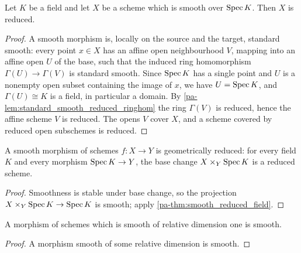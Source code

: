 \begin{theorem}
  \label{pa-thm:smooth_reduced_field}
  \leanok

  Let \(K\) be a field and let \(X\) be a scheme which is smooth over \(\operatorname{Spec} K\). Then \(X\)
  is reduced.
\end{theorem}
\begin{proof}
  \leanok
  A smooth morphism is, locally on the source and the target, standard smooth: every point
  \(x \in X\) has an affine open neighbourhood \(V\), mapping into an affine open \(U\) of the
  base, such that the induced ring homomorphism \(\Gamma(U) \to \Gamma(V)\) is standard
  smooth. Since \(\operatorname{Spec} K\) has a single point and \(U\) is a nonempty open subset containing
  the image of \(x\), we have \(U = \operatorname{Spec} K\), and \(\Gamma(U) \cong K\) is a field, in
  particular a domain. By \ref{pa-lem:standard_smooth_reduced_ringhom} the ring \(\Gamma(V)\) is
  reduced, hence the affine scheme \(V\) is reduced. The opens \(V\) cover \(X\), and a scheme
  covered by reduced open subschemes is reduced.
\end{proof}

\begin{theorem}
  \label{pa-thm:smooth_geometrically_reduced}
  \leanok

  A smooth morphism of schemes \(f : X \to Y\) is geometrically reduced: for every field \(K\)
  and every morphism \(\operatorname{Spec} K \to Y\), the base change \(X \times_Y \operatorname{Spec} K\) is a reduced
  scheme.
\end{theorem}
\begin{proof}
  \leanok
  Smoothness is stable under base change, so the projection
  \(X \times_Y \operatorname{Spec} K \to \operatorname{Spec} K\) is smooth; apply \ref{pa-thm:smooth_reduced_field}.
\end{proof}

\begin{lemma}
  \label{pa-lem:smooth_of_relDim_one}
  \leanok

  A morphism of schemes which is smooth of relative dimension one is smooth.
\end{lemma}
\begin{proof}
  \leanok
  A morphism smooth of some relative dimension is smooth.
\end{proof}

